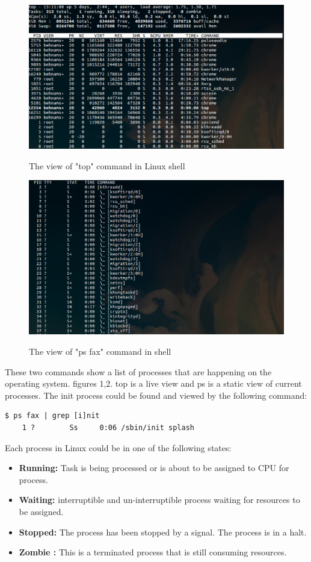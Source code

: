 \documentclass[journal,10pt,onecolumn,compsoc,letterpaper,draftclsnofoot,table,xcdraw]{IEEEtran} \usepackage[margin=0.75in]{geometry}
\begin{document}
\begin{figure}[ht]
\centering
\includegraphics[width=150mm]{graphics/Top-view} \\
\caption{The view of "top" command in Linux shell}
\end{figure}

\begin{figure}[ht]
\centering
\includegraphics[width=150mm]{graphics/ps} \\
\caption{The view of "ps fax" command in shell}
\end{figure}

\noindent These two commands show a list of processes that are happening on the operating system. figures 1,2. top is a live view and ps is a static view of current processes. The init process could be found and viewed by the following command:
\begin{verbatim}
$ ps fax | grep [i]nit
    1 ?        Ss     0:06 /sbin/init splash
\end{verbatim}
\noindent Each process in Linux could be in one of the following states:
\begin{itemize}
\item \textbf{Running:} Task is being processed or is about to be assigned to CPU for process.
\item \textbf{Waiting:} interruptible and un-interruptible process waiting for resources to be assigned.
\item \textbf{Stopped:} The process has been stopped by a signal. The process is in a halt.
\item \textbf{Zombie :} This is a terminated process that is still consuming resources.
\end{itemize}
\end{document}
